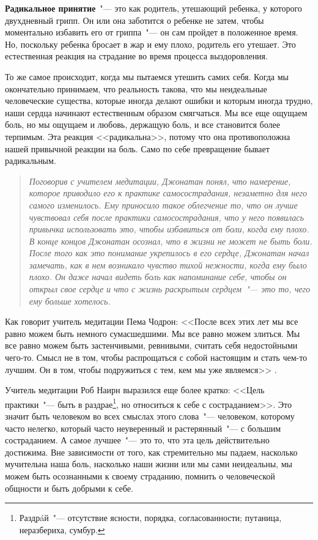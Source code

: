 \textbf{Радикальное принятие}~"--- это как родитель, утешающий ребенка, у которого двухдневный грипп. Он или она заботится о ребенке не затем, чтобы моментально избавить его от гриппа~"--- он сам пройдет в положенное время. Но, поскольку ребенка бросает в жар и ему плохо, родитель его утешает. Это естественная реакция на страдание во время процесса выздоровления.

То же самое происходит, когда мы пытаемся утешить самих себя. Когда мы окончательно принимаем, что реальность такова, что мы неидеальные человеческие существа, которые иногда делают ошибки и которым иногда трудно, наши сердца начинают естественным образом смягчаться. Мы все еще ощущаем боль, но мы ощущаем и любовь, держащую боль, и все становится более терпимым. Эта реакция <<радикальна>>, потому что она противоположна нашей привычной реакции на боль. Само по себе превращение бывает радикальным. 

\begin{quotation}
	\textit{
		Поговорив с учителем медитации, Джонатан понял, что намерение, которое приводило его к  	практике самосострадания, незаметно для него самого изменилось. Ему приносило такое облегчение то, что он лучше чувствовал себя после практики самосострадания, что у него появилась привычка использовать это, чтобы избавиться от боли, когда ему плохо. В конце концов Джонатан осознал, что в жизни не может не быть боли. После того как это понимание укрепилось в его сердце, Джонатан начал замечать, как в нем возникало чувство тихой нежности, когда ему было плохо. Он даже начал видеть боль как напоминание себе, чтобы он открыл свое сердце и что с жизнь раскрытым сердцем~"--- это то, чего ему больше хотелось.
	}
\end{quotation}

Как говорит учитель медитации Пема Чодрон: <<После всех этих лет мы все равно можем быть немного сумасшедшими. Мы все равно можем злиться. Мы все равно можем быть застенчивыми, ревнивыми, считать себя недостойными чего-то. Смысл не в том, чтобы распрощаться с собой настоящим и стать чем-то лучшим. Он в том, чтобы подружиться с тем, кем мы уже являемся>> \cite{80}.

Учитель медитации Роб Наирн выразился еще более кратко: <<Цель практики~"--- быть в раздрае\footnote{Раздр\'{a}й~"--- отсутствие ясности, порядка, согласованности; путаница, неразбериха, сумбур.}, но относиться к себе с состраданием>>\cite{81}. Это значит быть человеком во всех смыслах этого слова~"--- человеком, которому часто нелегко, который часто неуверенный и растерянный~"--- с большим состраданием.  А самое лучшее~"--- это то, что эта цель действительно достижима. Вне зависимости от того, как стремительно мы падаем, насколько мучительна наша боль, насколько наши жизни или мы сами неидеальны, мы можем быть осознанными к своему страданию, помнить о человеческой общности и быть добрыми к себе.

